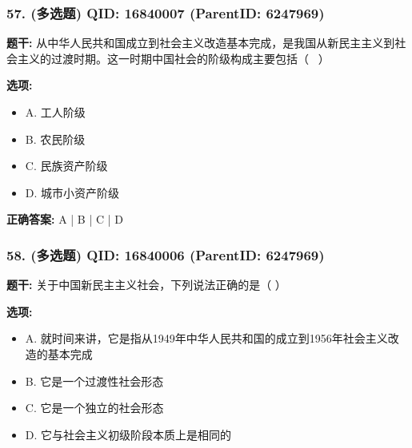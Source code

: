 \documentclass[12pt,UTF8]{ctexart}
\begin{document}
\vspace{0.3em}\hrulefill\vspace{0.7em}

\subsubsection*{57. (多选题) \small QID: 16840007 (ParentID: 6247969)}

\textbf{题干:}
从中华人民共和国成立到社会主义改造基本完成，是我国从新民主主义到社会主义的过渡时期。这一时期中国社会的阶级构成主要包括（  ）



\textbf{选项:}
\begin{itemize}[leftmargin=*]

  \item A. 工人阶级

  \item B. 农民阶级

  \item C. 民族资产阶级

  \item D. 城市小资产阶级

\end{itemize}

\textbf{正确答案:}
A | B | C | D

\vspace{0.3em}\hrulefill\vspace{0.7em}

\subsubsection*{58. (多选题) \small QID: 16840006 (ParentID: 6247969)}

\textbf{题干:}
关于中国新民主主义社会，下列说法正确的是（ ）



\textbf{选项:}
\begin{itemize}[leftmargin=*]

  \item A. 就时间来讲，它是指从1949年中华人民共和国的成立到1956年社会主义改造的基本完成

  \item B. 它是一个过渡性社会形态

  \item C. 它是一个独立的社会形态

  \item D. 它与社会主义初级阶段本质上是相同的

\end{itemize}
\end{document}
